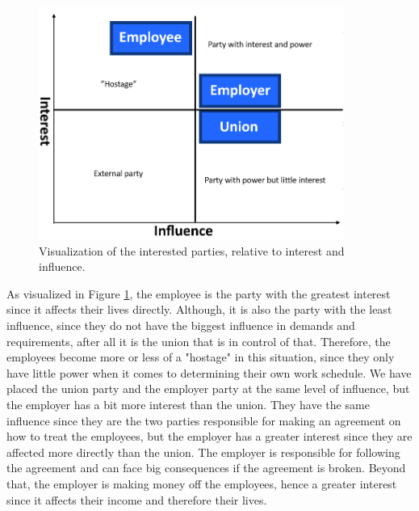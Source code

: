\begin{figure}[ht!]
    \centering
    \includegraphics[width=100mm]{media/NewInterestedParties.PNG}
    \caption{Visualization of the interested parties, relative to interest and influence.}
    \label{fig:Interested parties graph}
\end{figure}

As visualized in Figure \ref{fig:Interested parties graph}, the employee is the party with the greatest interest since it affects their lives directly. Although, it is also the party with the least influence, since they do not have the biggest influence in demands and requirements, after all it is the union that is in control of that. Therefore, the employees become more or less of a "hostage" in this situation, since they only have little power when it comes to determining their own work schedule. We have placed the union party and the employer party at the same level of influence, but the employer has a bit more interest than the union. They have the same influence since they are the two parties responsible for making an agreement on how to treat the employees, but the employer has a greater interest since they are affected more directly than the union. The employer is responsible for following the agreement and can face big consequences if the agreement is broken. Beyond that, the employer is making money off the employees, hence a greater interest since it affects their income and therefore their lives.
